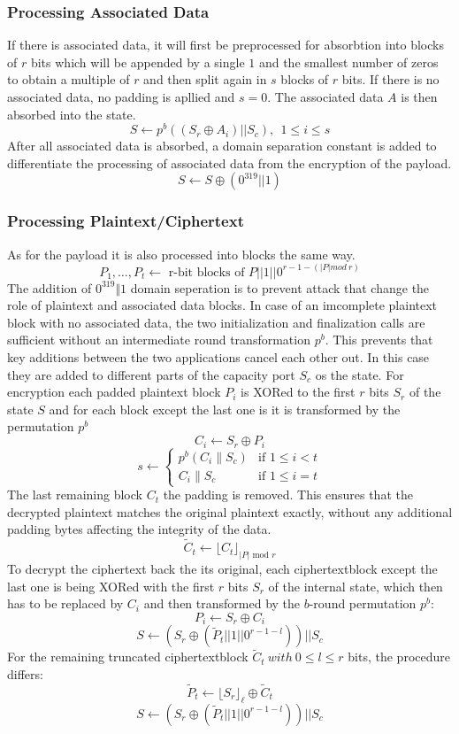 \subsubsection{Processing Associated Data}
If there is associated data, it will first be preprocessed for absorbtion into blocks of $r$ bits which will be appended by a single $1$ and the smallest number of zeros to obtain a multiple of $r$ and then split again in $s$ blocks of $r$ bits. If there is no associated data, no padding is apllied and $s=0$.
\sloppy
The associated data $A$ is then absorbed into the state.
\[
S \leftarrow p^b((S_r \oplus A_i) || S_c),\ \ 1 \leq i \leq s
\]
After all associated data is absorbed, a domain separation constant is added to differentiate the processing of associated data from the encryption of the payload. \cite[Chapter 2.4.2]{Ascon-v1.2}
$$S \leftarrow S \oplus (0^{319} || 1)$$

\subsubsection{Processing Plaintext/Ciphertext}
As for the payload it is also processed into blocks the same way. 
$$P_1, \dots , P_t \leftarrow \text{ r-bit blocks of } P || 1 || 0^{r-1-(|P| mod\ r)}$$
The addition of $0^{319} \Vert 1$ domain seperation is to prevent attack that change the role of plaintext and associated data blocks. In case of an imcomplete plaintext block with no associated data, the two initialization and finalization calls are sufficient without an intermediate round transformation $p^b$. This prevents that key additions between the two applications cancel each other out. In this case they are added to different parts of the capacity port $S_c$ os the state. \cite[Chapter 5.1.1]{Ascon-v1.2} \newline
For encryption each padded plaintext block $P_i$ is XORed to the first $r$ bits $S_r$ of the state $S$ and for each block except the last one is it is transformed by the permutation $p^b$%
$$C_i \leftarrow S_r \oplus P_i$$
$$
s \leftarrow \begin{cases} 
    p^b(C_i \parallel S_c) & \text{if } 1 \leq i < t \\
    C_i \parallel S_c & \text{if } 1 \leq i = t
    \end{cases}
$$
The last remaining block $C_t$ the padding is removed. This ensures that the decrypted plaintext matches the original plaintext exactly, without any additional padding bytes affecting the integrity of the data.
$$\tilde{C}_t \leftarrow \lfloor C_t \rfloor_{|P| \text{ mod } r}$$
\newline
To decrypt the ciphertext back the its original, each ciphertextblock except the last one is being XORed with the first $r$ bits $S_r$ of the internal state, which then has to be replaced by $C_i$ and then transformed by the $b$-round permutation $p^b$:
$$ P_i\leftarrow S_r \oplus C_i $$
$$ S \leftarrow (S_r \oplus (\tilde P_t || 1 || 0^{r-1-l})) || S_c $$
For the remaining truncated ciphertextblock $\tilde C_t\ with\ 0 \leq l \le r$ bits, the procedure differs:
$$\tilde{P}_t \leftarrow \lfloor S_r \rfloor_\ell \oplus \tilde{C}_t$$
$$S \leftarrow (S_r \oplus (\tilde P_t || 1 || 0^{r-1-l})) || S_c$$
\cite{Ascon-v1.2}

